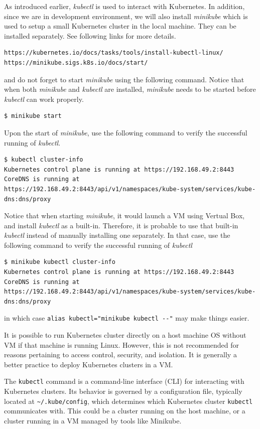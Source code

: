 As introduced earlier, \textit{kubectl} is used to interact with Kubernetes. In addition, since we are in development environment, we will also install \textit{minikube} which is used to setup a small Kubernetes cluster in the local machine. They can be installed separately. See following links for more details.
\begin{lstlisting}
https://kubernetes.io/docs/tasks/tools/install-kubectl-linux/
https://minikube.sigs.k8s.io/docs/start/
\end{lstlisting}
and do not forget to start \textit{minikube} using the following command. Notice that when both \textit{minikube} and \textit{kubectl} are installed, \textit{minikube} needs to be started before \textit{kubectl} can work properly.
\begin{lstlisting}
$ minikube start
\end{lstlisting}
Upon the start of \textit{minikube}, use the following command to verify the successful running of \textit{kubectl}.
\begin{lstlisting}
$ kubectl cluster-info
Kubernetes control plane is running at https://192.168.49.2:8443
CoreDNS is running at https://192.168.49.2:8443/api/v1/namespaces/kube-system/services/kube-dns:dns/proxy
\end{lstlisting}
Notice that when starting \textit{minikube}, it would launch a VM using Vertual Box, and install \textit{kubectl} as a built-in. Therefore, it is probable to use that built-in \textit{kubectl} instead of manually installing one separately. In that case, use the following command to verify the successful running of \textit{kubectl}
\begin{lstlisting}
$ minikube kubectl cluster-info
Kubernetes control plane is running at https://192.168.49.2:8443
CoreDNS is running at https://192.168.49.2:8443/api/v1/namespaces/kube-system/services/kube-dns:dns/proxy
\end{lstlisting}
in which case \verb|alias kubectl="minikube kubectl --"| may make things easier.

It is possible to run Kubernetes cluster directly on a host machine OS without VM if that machine is running Linux. However, this is not recommended for reasons pertaining to access control, security, and isolation. It is generally a better practice to deploy Kubernetes clusters in a VM.

The \verb|kubectl| command is a command-line interface (CLI) for interacting with Kubernetes clusters. Its behavior is governed by a configuration file, typically located at \verb|~/.kube/config|, which determines which Kubernetes cluster \verb|kubectl| communicates with. This could be a cluster running on the host machine, or a cluster running in a VM managed by tools like Minikube. 

